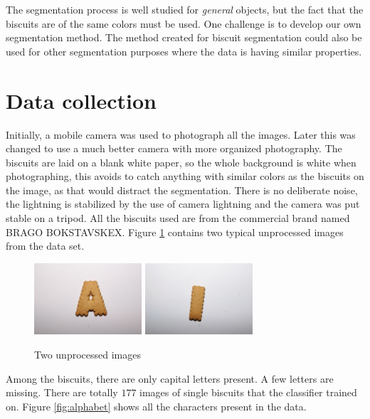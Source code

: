 \documentclass[a4paper,11pt]{article}
\begin{document}
The segmentation process is well studied for \emph{general} objects, but the fact that the biscuits are of the same colors must be used.
One challenge is to develop our own segmentation method.
The method created for biscuit segmentation could also be used for other segmentation purposes where the data is having similar properties.

\section{Data collection}
Initially, a mobile camera was used to photograph all the images.
Later this was changed to use a much better camera with more organized photography.
The biscuits are laid on a blank white paper, so the whole background is white when photographing, this avoids to catch anything with similar colors as the biscuits on the image, as that would distract the segmentation.
There is no deliberate noise, the lightning is stabilized by the use of camera lightning and the camera was put stable on a tripod.
All the biscuits used are from the commercial brand named BRAGO BOKSTAVSKEX.
Figure \ref{fig:unprocessed} contains two typical unprocessed images from the data set.

\begin{figure}[]
\begin{center}
\includegraphics[width=40mm]{orig_a.JPG}
\includegraphics[width=40mm]{orig_i.JPG}
\end{center}
\caption{Two unprocessed images}
\label{fig:unprocessed}
\end{figure}

Among the biscuits, there are only capital letters present. A few letters are missing.
There are totally $177$ images of single biscuits that the classifier trained on.
Figure \ref{fig:alphabet} shows all the characters present in the data.
\end{document}
